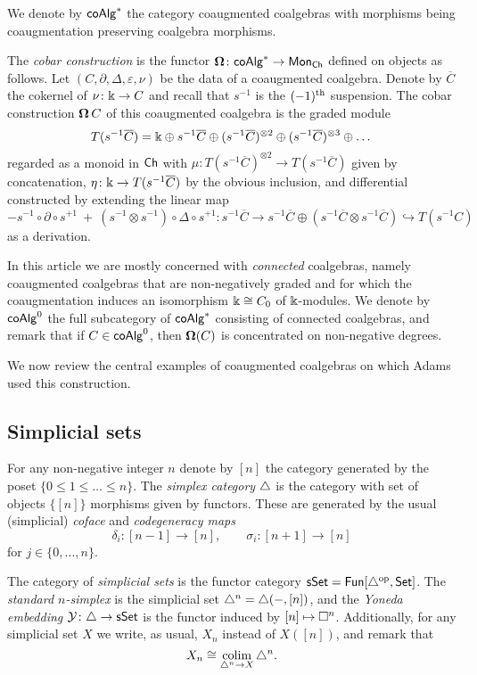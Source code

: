 We denote by $\mathsf{coAlg}^\ast$ the category coaugmented coalgebras with morphisms being coaugmentation preserving coalgebra morphisms.

The \textit{cobar construction} is the functor $\operatorname{\mathbf{\Omega}} \colon \mathsf{coAlg}^\ast \to \mathsf{Mon}_{\mathsf{Ch}}$ defined on objects as follows.
Let $(C, \partial, \Delta, \varepsilon, \nu)$ be the data of a coaugmented coalgebra.
Denote by $\overline{C}$ the cokernel of $\nu \colon \Bbbk \to C$ and recall that $s^{-1}$ is the $(-1)^{\mathrm{th}}$ suspension.
The cobar construction $\operatorname{\mathbf{\Omega}} C$ of this coaugmented coalgebra is the graded module
\[
T(s^{-1} \overline{C}) = \Bbbk \oplus s^{-1}\overline{C} \oplus (s^{-1}\overline{C})^{\otimes 2} \oplus (s^{-1}\overline{C})^{\otimes 3} \oplus \dots
\]
regarded as a monoid in $\mathsf{Ch}$ with $\mu \colon T(s^{-1} \overline{C})^{\otimes 2} \to T(s^{-1} \overline{C})$ given by concatenation, $\eta \colon \Bbbk \to T(s^{-1} \overline{C})$ by the obvious inclusion, and differential constructed by extending the linear map
\[
- s^{-1} \circ \partial \circ s^{+1} \ + \ (s^{-1} \otimes s^{-1}) \circ \Delta \circ s^{+1} \colon
s^{-1} \overline{C} \to s^{-1}\overline{C} \oplus (s^{-1}\overline{C} \otimes s^{-1}\overline{C}) \hookrightarrow T(s^{-1}C)
\]
as a derivation.

In this article we are mostly concerned with \textit{connected} coalgebras, namely coaugmented coalgebras that are non-negatively graded and for which the coaugmentation induces an isomorphism $\Bbbk \cong C_0$ of $\Bbbk$-modules.
We denote by $\mathsf{coAlg}^0$ the full subcategory of $\mathsf{coAlg}^\ast$ consisting of connected coalgebras, and remark that if $C \in \mathsf{coAlg}^0$, then $ \operatorname{\mathbf{\Omega}}(C)$ is concentrated on non-negative degrees.

We now review the central examples of coaugmented coalgebras on which Adams used this construction.

\subsection{Simplicial sets}

For any non-negative integer $n$ denote by $[n]$ the category generated by the poset $\{0 \leq 1 \leq \dots \leq n\}$.
The \textit{simplex category} $\triangle$ is the category with set of objects $\big\{ [n] \big\}$ morphisms given by functors.
These are generated by the usual (simplicial) \textit{coface} and \textit{codegeneracy maps}
\[
\delta_i \colon [n-1] \to [n], \qquad \sigma_i \colon [n+1] \to [n]
\]
for $j \in \{0, \dots, n\}$.

The category of \textit{simplicial sets} is the functor category $\mathsf{sSet} = \mathsf{Fun}[\triangle^{\mathrm{op}}, \mathsf{Set}]$.
The \textit{standard $n$-simplex} is the simplicial set $\triangle^n = \triangle(-, [n])$, and the \textit{Yoneda embedding} $\mathcal{Y} \colon \triangle \to \mathsf{sSet}$ is the functor induced by $[n] \mapsto \square^n$.
Additionally, for any simplicial set $X$ we write, as usual, $X_n$ instead of $X([n])$, and remark that
\[
X_n \cong \operatorname*{colim}_{\triangle^n \to X} \triangle^n.
\]

